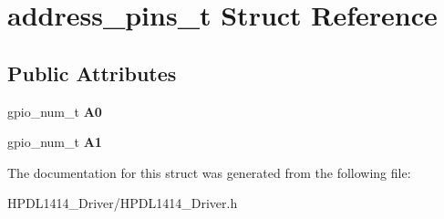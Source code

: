 \hypertarget{structaddress__pins__t}{}\section{address\+\_\+pins\+\_\+t Struct Reference}
\label{structaddress__pins__t}
\subsection*{Public Attributes}
\begin{DoxyCompactItemize}
\item 
\mbox{\label{structaddress__pins__t_a8af51e66508615de2663318037efbeaa}} 
gpio\+\_\+num\+\_\+t {\bfseries A0}
\item 
\mbox{\label{structaddress__pins__t_a28be2dff3d8730e58ecf9538e82f8033}} 
gpio\+\_\+num\+\_\+t {\bfseries A1}
\end{DoxyCompactItemize}


The documentation for this struct was generated from the following file\+:\begin{DoxyCompactItemize}
\item 
H\+P\+D\+L1414\+\_\+\+Driver/H\+P\+D\+L1414\+\_\+\+Driver.\+h\end{DoxyCompactItemize}

